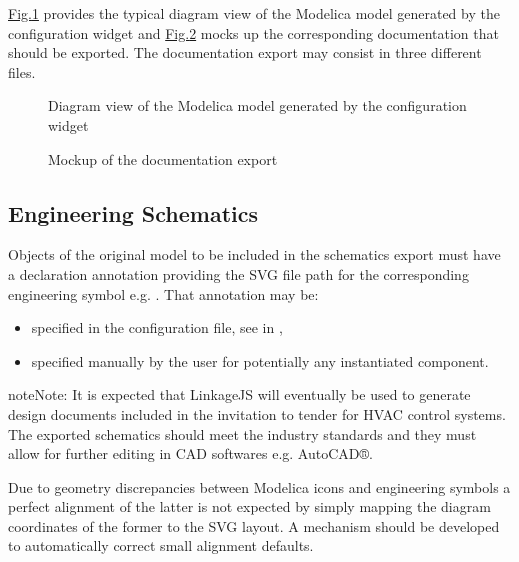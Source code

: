 \documentclass[letterpaper,10pt, openany,english]{sphinxmanual}
\begin{document}
\hyperref[\detokenize{requirements:screen-schematics-modelica}]{Fig.\@ \ref{\detokenize{requirements:screen-schematics-modelica}}} provides the typical diagram view of the Modelica model generated by the configuration widget and \hyperref[\detokenize{requirements:screen-schematics-output}]{Fig.\@ \ref{\detokenize{requirements:screen-schematics-output}}} mocks up the corresponding documentation that should be exported. The documentation export may consist in three different files.

\begin{figure}[htbp]
\centering
\capstart

\noindent{}
\caption{Diagram view of the Modelica model generated by the configuration widget}\label{\detokenize{requirements:screen-schematics-modelica}}\end{figure}

\begin{figure}[htbp]
\centering
\capstart

\noindent{}
\caption{Mockup of the documentation export}\label{\detokenize{requirements:screen-schematics-output}}\end{figure}


\subsection{Engineering Schematics}
\label{\detokenize{requirements:engineering-schematics}}
Objects of the original model to be included in the schematics export must have a declaration annotation providing the SVG file path for the corresponding engineering symbol e.g. . That annotation may be:
\begin{itemize}
\item {} 
specified in the configuration file, see  in {\hyperref[\detokenize{requirements:configuration-api}]{}},

\item {} 
specified manually by the user for potentially any instantiated component.

\end{itemize}

\begin{sphinxadmonition}{note}{Note:}
It is expected that LinkageJS will eventually be used to generate design documents included in the invitation to tender for HVAC control systems. The exported schematics should meet the industry standards and they must allow for further editing in CAD softwares e.g. AutoCAD®.

Due to geometry discrepancies between Modelica icons and engineering symbols a perfect alignment of the latter is not expected by simply mapping the diagram coordinates of the former to the SVG layout. A mechanism should be developed to automatically correct small alignment defaults.
\end{sphinxadmonition}
\end{document}
